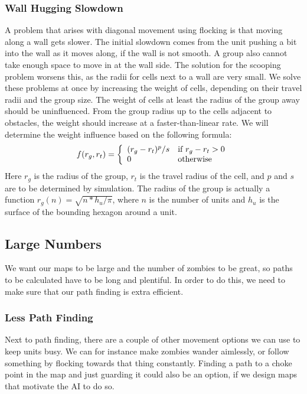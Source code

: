 \subsubsection{Wall Hugging Slowdown}
A problem that arises with diagonal movement using flocking is that moving along a wall gets slower. The initial slowdown comes from the unit pushing a bit into the wall as it moves along, if the wall is not smooth. A group also cannot take enough space to move in at the wall side. The solution for the scooping problem worsens this, as the radii for cells next to a wall are very small. We solve these problems at once by increasing the weight of cells, depending on their travel radii and the group size. The weight of cells at least the radius of the group away should be uninfluenced. From the group radius up to the cells adjacent to obstacles, the weight should increase at a faster-than-linear rate. We will determine the weight influence based on the following formula:
$$f(r_g, r_t) = \left\{\begin{array}{l l}
					(r_g - r_t)^p / s & \text{if } r_g - r_t > 0\\
					0 & \text{otherwise}
                \end{array}\right.
                $$
Here $r_g$ is the radius of the group, $r_t$ is the travel radius of the cell, and $p$ and $s$ are to be determined by simulation. The radius of the group is actually a function $r_g(n) = \sqrt{n * h_u / \pi}$, where $n$ is the number of units and $h_u$ is the surface of the bounding hexagon around a unit.

\subsection{Large Numbers}
We want our maps to be large and the number of zombies to be great, so paths to be calculated have to be long and plentiful. In order to do this, we need to make sure that our path finding is extra efficient.

\subsubsection{Less Path Finding}
Next to path finding, there are a couple of other movement options we can use to keep units busy. We can for instance make zombies wander aimlessly, or follow something by flocking towards that thing constantly. Finding a path to a choke point in the map and just guarding it could also be an option, if we design maps that motivate the AI to do so.

